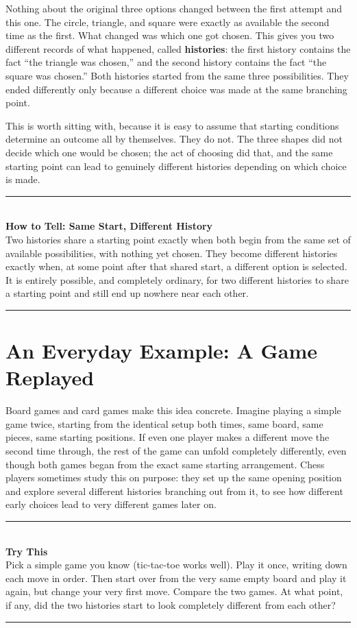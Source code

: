 \documentclass[11pt]{book}
\newenvironment{algorithmproc}[1]{%
\vspace{0.6em}\noindent\rule{\linewidth}{0.6pt}\\[0.2em]\textbf{How to Tell: #1}\\[0.3em]}%
{\\[0.2em]\noindent\rule{\linewidth}{0.6pt}\vspace{0.6em}}
\newenvironment{trythis}{%
\vspace{0.6em}\noindent\rule{\linewidth}{0.6pt}\\[0.2em]\textbf{Try This}\\[0.3em]}%
{\\[0.2em]\noindent\rule{\linewidth}{0.6pt}\vspace{0.6em}}
\begin{document}
Nothing about the original three options changed between the first attempt and this one. The circle, triangle, and square were exactly as available the second time as the first. What changed was which one got chosen. This gives you two different records of what happened, called \textbf{histories}: the first history contains the fact ``the triangle was chosen,'' and the second history contains the fact ``the square was chosen.'' Both histories started from the same three possibilities. They ended differently only because a different choice was made at the same branching point.

This is worth sitting with, because it is easy to assume that starting conditions determine an outcome all by themselves. They do not. The three shapes did not decide which one would be chosen; the act of choosing did that, and the same starting point can lead to genuinely different histories depending on which choice is made.

\begin{algorithmproc}{Same Start, Different History}
Two histories share a starting point exactly when both begin from the same set of available possibilities, with nothing yet chosen. They become different histories exactly when, at some point after that shared start, a different option is selected. It is entirely possible, and completely ordinary, for two different histories to share a starting point and still end up nowhere near each other.
\end{algorithmproc}

\section{An Everyday Example: A Game Replayed}

Board games and card games make this idea concrete. Imagine playing a simple game twice, starting from the identical setup both times, same board, same pieces, same starting positions. If even one player makes a different move the second time through, the rest of the game can unfold completely differently, even though both games began from the exact same starting arrangement. Chess players sometimes study this on purpose: they set up the same opening position and explore several different histories branching out from it, to see how different early choices lead to very different games later on.

\begin{trythis}
Pick a simple game you know (tic-tac-toe works well). Play it once, writing down each move in order. Then start over from the very same empty board and play it again, but change your very first move. Compare the two games. At what point, if any, did the two histories start to look completely different from each other?
\end{trythis}
\end{document}
